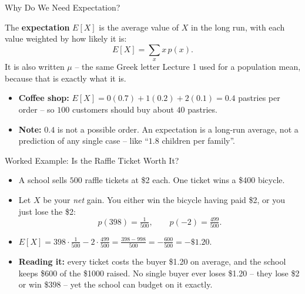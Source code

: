 \begin{frame}{Why Do We Need Expectation?}
\begin{rldefinition}
The \textbf{expectation} $E[X]$ is the average value of $X$ in the long run, with each value weighted by how likely it is:
\[
E[X] = \sum_x x\,p(x) .
\]
It is also written $\mu$ -- the same Greek letter Lecture 1 used for a population mean, because that is exactly what it is.
\end{rldefinition}
\pause
\begin{itemize}
  \item \textbf{Coffee shop:} $E[X] = 0(0.7) + 1(0.2) + 2(0.1) = 0.4$ pastries per order -- so $100$ customers should buy about $40$ pastries.
  \pause
  \item \textbf{Note:} $0.4$ is not a possible order. An expectation is a long-run average, not a prediction of any single case -- like ``$1.8$ children per family''.
\end{itemize}
\end{frame}

\begin{frame}{Worked Example: Is the Raffle Ticket Worth It?}
\begin{itemize}
  \item A school sells $500$ raffle tickets at \$2 each. One ticket wins a \$400 bicycle.
  \pause
  \item Let $X$ be your \emph{net} gain. You either win the bicycle having paid \$2, or you just lose the \$2:
  \[
    p(398) = \tfrac{1}{500}, \qquad p(-2) = \tfrac{499}{500}.
  \]
  \pause
  \item $E[X] = 398 \cdot \tfrac{1}{500} - 2 \cdot \tfrac{499}{500} = \tfrac{398 - 998}{500} = -\tfrac{600}{500} = -\$1.20$.
  \pause
  \item \textbf{Reading it:} every ticket costs the buyer \$1.20 on average, and the school keeps \$600 of the \$1000 raised. No single buyer ever loses \$1.20 -- they lose \$2 or win \$398 -- yet the school can budget on it exactly.
\end{itemize}
\end{frame}

